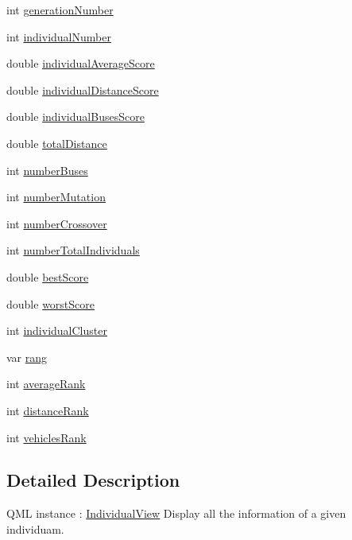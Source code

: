 \begin{DoxyCompactItemize}
\item 
int \hyperlink{class_individual_view_a1041b5080b9959361b6c9e5d1198c741}{generation\+Number}
\item 
int \hyperlink{class_individual_view_a63fd3b556f45623e6bbc016affba57ec}{individual\+Number}
\item 
double \hyperlink{class_individual_view_ae2797ff72ab51fde26cf28106a536930}{individual\+Average\+Score}
\item 
double \hyperlink{class_individual_view_a4a7bde66bdfd21ce7e8246ceef09a011}{individual\+Distance\+Score}
\item 
double \hyperlink{class_individual_view_a9fa40c39e9eea72f4107d8b1dabcdddb}{individual\+Buses\+Score}
\item 
double \hyperlink{class_individual_view_a8d08885c5f5158cd8c79d8992e705bfb}{total\+Distance}
\item 
int \hyperlink{class_individual_view_a41ba574a572f72e2b60b5d006ce43f65}{number\+Buses}
\item 
int \hyperlink{class_individual_view_a0a21901dcf937da97c5ce6fbf6063277}{number\+Mutation}
\item 
int \hyperlink{class_individual_view_a7cc766a22d5df8779757fdf48a8a6f74}{number\+Crossover}
\item 
int \hyperlink{class_individual_view_a7134bec775eee637bd2c782b1a5dc2ef}{number\+Total\+Individuals}
\item 
double \hyperlink{class_individual_view_a42d9d2738627b7ab2b062ed0d148bf15}{best\+Score}
\item 
double \hyperlink{class_individual_view_a65da50c477212f4969c5a2a1e87c1d82}{worst\+Score}
\item 
int \hyperlink{class_individual_view_a790d86cd55819ef715d76a1f54f237f7}{individual\+Cluster}
\item 
var \hyperlink{class_individual_view_ae8159ede7a7101e03aaae2cb771f621b}{rang}
\item 
int \hyperlink{class_individual_view_a42eee4cb17b3e2487b4e9af6a0ab8860}{average\+Rank}
\item 
int \hyperlink{class_individual_view_ad4abf982f3f07a65007ea3b79dcb037a}{distance\+Rank}
\item 
int \hyperlink{class_individual_view_a29df5add0d513ab175c490278042ce80}{vehicles\+Rank}
\end{DoxyCompactItemize}


\subsection{Detailed Description}
Q\+ML instance \+: \hyperlink{class_individual_view}{Individual\+View} Display all the information of a given individuam. 


